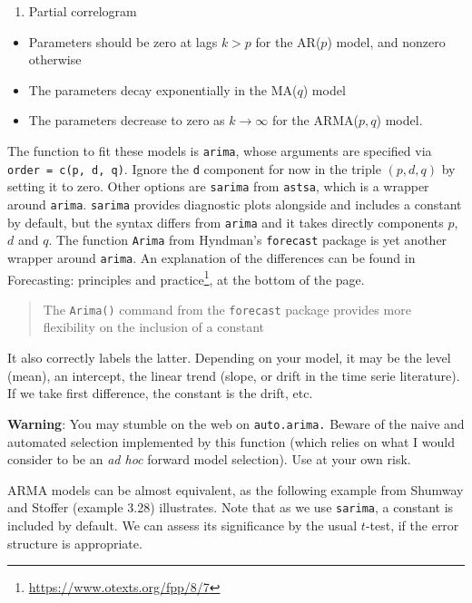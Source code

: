 \documentclass[]{book}
\providecommand{\tightlist}{%
  \setlength{\itemsep}{0pt}\setlength{\parskip}{0pt}}
\let\rmarkdownfootnote\footnote%
\def\footnote{\protect\rmarkdownfootnote}
\renewcommand{\href}[2]{#2\footnote{\url{#1}}}
\begin{document}
\begin{enumerate}
\def\labelenumi{\arabic{enumi}.}
\setcounter{enumi}{2}
\tightlist
\item
  Partial correlogram
\end{enumerate}

\begin{itemize}
\tightlist
\item
  Parameters should be zero at lags \(k>p\) for the AR(\(p\)) model, and nonzero otherwise
\item
  The parameters decay exponentially in the MA(\(q\)) model
\item
  The parameters decrease to zero as \(k \to \infty\) for the ARMA(\(p, q\)) model.
\end{itemize}

The function to fit these models is \texttt{arima}, whose arguments are specified via \texttt{order\ =\ c(p,\ d,\ q)}. Ignore the \texttt{d} component for now in the triple \((p, d, q)\) by setting it to zero. Other options are \texttt{sarima} from \texttt{astsa}, which is a wrapper around \texttt{arima}. \texttt{sarima} provides diagnostic plots alongside and includes a constant by default, but the syntax differs from \texttt{arima} and it takes directly components \(p\), \(d\) and \(q\). The function \texttt{Arima} from Hyndman's \texttt{forecast} package is yet another wrapper around \texttt{arima}. An explanation of the differences can be found in \href{https://www.otexts.org/fpp/8/7}{Forecasting: principles and practice}, at the bottom of the page.

\begin{quote}
The \texttt{Arima()} command from the \texttt{forecast} package provides more flexibility on the inclusion of a constant
\end{quote}

It also correctly labels the latter. Depending on your model, it may be the level (mean), an intercept, the linear trend (slope, or drift in the time serie literature). If we take first difference, the constant is the drift, etc.

\textbf{Warning}: You may stumble on the web on \texttt{auto.arima.} Beware of the naive and automated selection implemented by this function (which relies on what I would consider to be an \emph{ad hoc} forward model selection). Use at your own risk.

ARMA models can be almost equivalent, as the following example from Shumway and Stoffer (example 3.28) illustrates. Note that as we use \texttt{sarima}, a constant is included by default. We can assess its significance by the usual \(t\)-test, if the error structure is appropriate.
\end{document}

